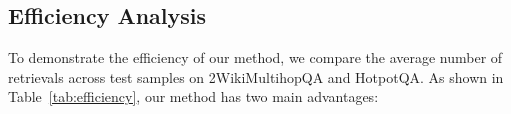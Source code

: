 


\subsection{Efficiency Analysis}





To demonstrate the efficiency of our method, we compare the average number of retrievals across test samples on 2WikiMultihopQA and HotpotQA. As shown in Table~\ref{tab:efficiency}, our method has two main advantages:

